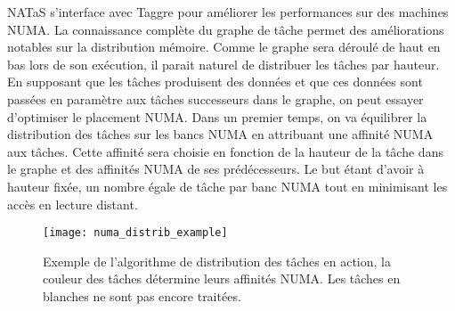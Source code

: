 NATaS s'interface avec Taggre pour améliorer les performances sur des machines NUMA.
%
La connaissance complète du graphe de tâche permet des améliorations notables sur la distribution mémoire.
%
Comme le graphe sera déroulé de haut en bas lors de son exécution, il parait naturel de distribuer les tâches par hauteur.
%
En supposant que les tâches produisent des données et que ces données sont passées en paramètre aux tâches successeurs dans le graphe, on peut essayer d'optimiser le placement NUMA.
%
Dans un premier temps, on va équilibrer la distribution des tâches sur les bancs NUMA en attribuant une affinité NUMA aux tâches.
%
Cette affinité sera choisie en fonction de la hauteur de la tâche dans le graphe et des affinités NUMA de ses prédécesseurs.
%
Le but étant d'avoir à hauteur fixée, un nombre égale de tâche par banc NUMA tout en minimisant les accès en lecture distant.



\begin{figure}
  \centering
  \texttt{[image: numa\_distrib\_example]}
  \caption{Exemple de l'algorithme de distribution des tâches en action, la couleur des tâches détermine leurs affinités NUMA. Les tâches en blanches ne sont pas encore traitées.}
  \label{fig:numa_distrib_example}
\end{figure}
